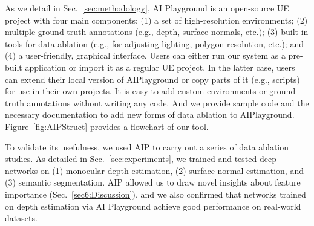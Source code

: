 \documentclass[runningheads]{llncs}
\begin{document}
As we detail in Sec.~\ref{sec:methodology}, AI Playground is an open-source UE project with four main components: (1) a set of high-resolution environments; (2) multiple ground-truth annotations (e.g., depth, surface normals, etc.); (3) built-in tools for data ablation (e.g., for adjusting lighting, polygon resolution, etc.); and (4) a user-friendly, graphical interface. Users can either run our system as a pre-built application or import it as a regular UE project. In the latter case, users can extend their local version of AIPlayground or copy parts of it (e.g., scripts) for use in their own projects. It is easy to add custom environments or ground-truth annotations without writing any code. And we provide sample code and the necessary documentation to add new forms of data ablation to AIPlayground. Figure~\ref{fig:AIPStruct} provides a flowchart of our tool.












To validate its usefulness, we used AIP to carry out a series of data ablation studies. As detailed in Sec.~\ref{sec:experiments}, we trained and tested deep networks on (1) monocular depth estimation, (2) surface normal estimation, and (3) semantic segmentation. AIP allowed us to draw novel insights about feature importance (Sec.~\ref{sec6:Discussion}), and we also confirmed that networks trained on depth estimation via AI Playground achieve good performance on real-world datasets. 
\end{document}
